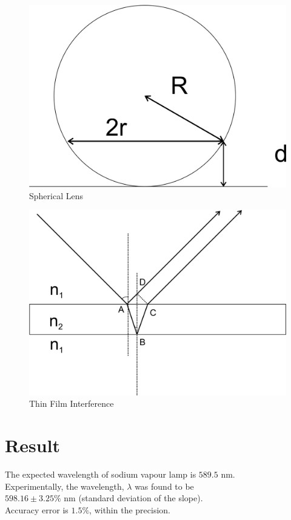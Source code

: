 	\begin{figure}[bth]
		\begin{center}
			\includegraphics[width=0.8\linewidth]{gfx/E1_A.jpg}
		\end{center}
	\caption[Spherical Lens]{Spherical Lens}
	\label{1_fig1}
	\end{figure}

	\begin{figure}[bth]
		\begin{center}
			\includegraphics[width=0.8\linewidth]{gfx/E1_B.jpg}
		\end{center}
	\caption[Thin Film Interference]{Thin Film Interference}
	\label{1_fig2}
	\end{figure}

\section{Result}
	The expected wavelength of sodium vapour lamp is $589.5$ nm. \\
	Experimentally, the wavelength, $\lambda$ was found to be \\
	$598.16\pm 3.25\%$ nm (standard deviation of the slope).\\
	Accuracy error is $1.5\%$, within the precision.
